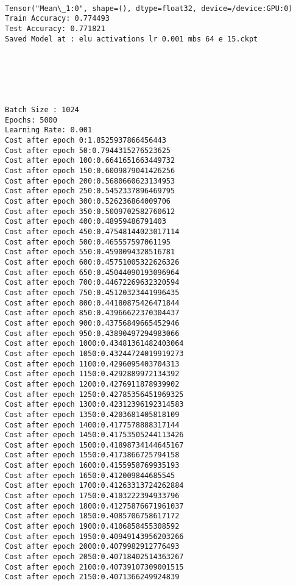 \documentclass[11pt]{article}
\begin{document}
    \begin{center}
    \end{center}
    { \hspace*{\fill} \\}
    
    \begin{Verbatim}[commandchars=\\\{\}]
Tensor("Mean\_1:0", shape=(), dtype=float32, device=/device:GPU:0)
Train Accuracy: 0.774493
Test Accuracy: 0.771821
Saved Model at : elu activations lr 0.001 mbs 64 e 15.ckpt






Batch Size : 1024
Epochs: 5000
Learning Rate: 0.001  
Cost after epoch 0:1.8525937866456443
Cost after epoch 50:0.7944315276523625
Cost after epoch 100:0.6641651663449732
Cost after epoch 150:0.6009879041426256
Cost after epoch 200:0.5680660623134953
Cost after epoch 250:0.5452337896469795
Cost after epoch 300:0.526236864009706
Cost after epoch 350:0.5009702582760612
Cost after epoch 400:0.48959486791403
Cost after epoch 450:0.47548144023017114
Cost after epoch 500:0.465557597061195
Cost after epoch 550:0.4590094328516781
Cost after epoch 600:0.45751005322626326
Cost after epoch 650:0.45044090193096964
Cost after epoch 700:0.44672269632320594
Cost after epoch 750:0.45120323441996435
Cost after epoch 800:0.44180875426471844
Cost after epoch 850:0.43966622370304437
Cost after epoch 900:0.43756849665452946
Cost after epoch 950:0.43890497294983066
Cost after epoch 1000:0.43481361482403064
Cost after epoch 1050:0.43244724019919273
Cost after epoch 1100:0.4296095403704313
Cost after epoch 1150:0.4292889972134392
Cost after epoch 1200:0.4276911878939902
Cost after epoch 1250:0.42785356451969325
Cost after epoch 1300:0.42312396192314583
Cost after epoch 1350:0.4203681405818109
Cost after epoch 1400:0.4177578888317144
Cost after epoch 1450:0.41753505244113426
Cost after epoch 1500:0.41898734144645167
Cost after epoch 1550:0.4173866725794158
Cost after epoch 1600:0.4155958769935193
Cost after epoch 1650:0.412009844685545
Cost after epoch 1700:0.41263313724262884
Cost after epoch 1750:0.4103222394933796
Cost after epoch 1800:0.41275876671961037
Cost after epoch 1850:0.4085706758617172
Cost after epoch 1900:0.4106858455308592
Cost after epoch 1950:0.40949143956203266
Cost after epoch 2000:0.4079982912776493
Cost after epoch 2050:0.40718402514363267
Cost after epoch 2100:0.40739107309001515
Cost after epoch 2150:0.4071366249924839

\end{Verbatim}
\end{document}
